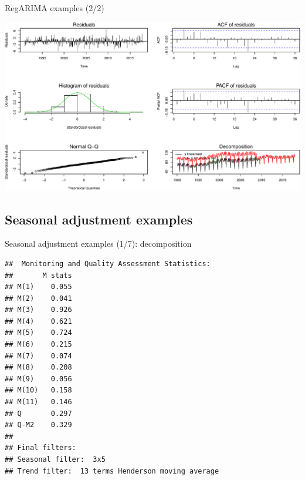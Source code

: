 \documentclass[10pt,xcolor=table,color={dvipsnames,usenames},ignorenonframetext,usepdftitle=false,french]{beamer}
\newenvironment{Shaded}{\begin{snugshade}}{\end{snugshade}}
\newcommand{\DataTypeTok}[1]{\textcolor[rgb]{0.13,0.29,0.53}{#1}}
\newcommand{\DecValTok}[1]{\textcolor[rgb]{0.00,0.00,0.81}{#1}}
\newcommand{\KeywordTok}[1]{\textcolor[rgb]{0.13,0.29,0.53}{\textbf{#1}}}
\newcommand{\NormalTok}[1]{#1}
\newcommand{\OperatorTok}[1]{\textcolor[rgb]{0.81,0.36,0.00}{\textbf{#1}}}
\newcommand{\OtherTok}[1]{\textcolor[rgb]{0.56,0.35,0.01}{#1}}
\begin{document}
\begin{frame}[fragile]{RegARIMA examples (2/2)}
\protect\hypertarget{regarima-examples-22}{}

\begin{Shaded}
\end{Shaded}

\includegraphics{img/markdown-unnamed-chunk-6-1.pdf}

\end{frame}

\hypertarget{seasonal-adjustment-examples}{%
\subsection{Seasonal adjustment
examples}\label{seasonal-adjustment-examples}}

\begin{frame}[fragile]{Seasonal adjustment examples (1/7):
decomposition}
\protect\hypertarget{seasonal-adjustment-examples-17-decomposition}{}

\footnotesize

\begin{Shaded}
\end{Shaded}

\begin{verbatim}
##  Monitoring and Quality Assessment Statistics:  
##       M stats
## M(1)    0.055
## M(2)    0.041
## M(3)    0.926
## M(4)    0.621
## M(5)    0.724
## M(6)    0.215
## M(7)    0.074
## M(8)    0.208
## M(9)    0.056
## M(10)   0.158
## M(11)   0.146
## Q       0.297
## Q-M2    0.329
## 
## Final filters: 
## Seasonal filter:  3x5
## Trend filter:  13 terms Henderson moving average
\end{verbatim}

\end{frame}
\end{document}
